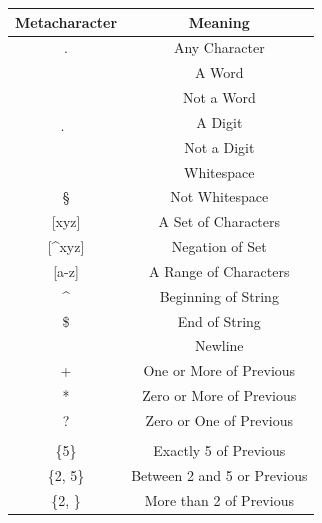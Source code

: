 \documentclass[]{book}
\begin{document}
\begin{longtable}[]{@{}cc@{}}
\toprule
Metacharacter & Meaning\tabularnewline
\midrule
\endhead
. & Any Character\tabularnewline
\w & A Word\tabularnewline
\W & Not a Word\tabularnewline
\d & A Digit\tabularnewline
\D & Not a Digit\tabularnewline
\s & Whitespace\tabularnewline
\S & Not Whitespace\tabularnewline
{[}xyz{]} & A Set of Characters\tabularnewline
{[}\^{}xyz{]} & Negation of Set\tabularnewline
{[}a-z{]} & A Range of Characters\tabularnewline
\^{} & Beginning of String\tabularnewline
\$ & End of String\tabularnewline
\n & Newline\tabularnewline
+ & One or More of Previous\tabularnewline
* & Zero or More of Previous\tabularnewline
? & Zero or One of Previous\tabularnewline
&\tabularnewline
\{5\} & Exactly 5 of Previous\tabularnewline
\{2, 5\} & Between 2 and 5 or Previous\tabularnewline
\{2, \} & More than 2 of Previous\tabularnewline
\bottomrule
\end{longtable}
\end{document}

